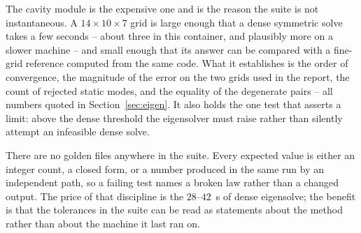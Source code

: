The cavity module is the expensive one and is the reason the suite is not instantaneous. A $14\times10\times7$
grid is large enough that a dense symmetric solve takes a few seconds -- about three in this container, and
plausibly more on a slower machine -- and small enough that its answer can be
compared with a fine-grid reference computed from the same code. What it establishes is the order of convergence,
the magnitude of the error on the two grids used in the report, the count of rejected static modes, and the
equality of the degenerate pairs -- all numbers quoted in Section~\ref{sec:eigen}. It also holds the one test
that asserts a limit: above the dense threshold the eigensolver must raise rather than silently attempt an
infeasible dense solve.

There are no golden files anywhere in the suite. Every expected value is either an integer count, a closed form,
or a number produced in the same run by an independent path, so a failing test names a broken law rather than a
changed output. The price of that discipline is the $28$--$42$~s of dense eigensolve; the benefit is that the
tolerances in the suite can be read as statements about the method rather than about the machine it last ran on.
